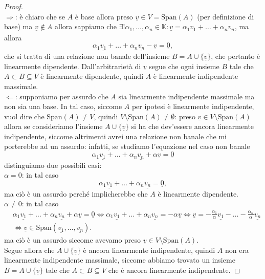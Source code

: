 \begin{proof} \hspace{1cm} \\
    $\boxed{\Rightarrow}$: è chiaro che se $A$ è base allora preso $\underline{v} \in V = \text{Span}(A)$ (per definizione di base) ma $\underline{v} \not\in A$ allora sappiamo che $\exists! \alpha_1, \ldots, \alpha_n \in \mathbb{K} : \underline{v} = \alpha_1 \underline{v_1} + \ldots + \alpha_n \underline{v_n}$, ma allora
    $$
        \alpha_1 \underline{v_1} + \ldots + \alpha_n \underline{v_n} - \underline{v} = \underline{0},
    $$
    che si tratta di una relazione non banale dell'insieme $B = A \cup \{\underline{v} \}$, che pertanto è linearmente dipendente. Dall'arbitrarietà di $\underline{v}$ segue che ogni insieme $B$ tale che $A \subset B \subseteq V$ è linearmente dipendente, quindi $A$ è linearmente indipendente massimale. \\
    $\boxed{\Leftarrow}$: supponiamo per assurdo che $A$ sia linearmente indipendente massimale ma non sia una base. In tal caso, siccome $A$ per ipotesi è linearmente indipendente, vuol dire che $\text{Span}(A) \neq V$, quindi $V \setminus \text{Span}(A) \neq \emptyset$: preso $\underline{v} \in V \setminus \text{Span}(A)$ allora se consideriamo l'insieme
    $A \cup \{ \underline{v} \}$ si ha che dev'essere ancora linearmente indipendente, siccome altrimenti avrei una relazione non banale che mi porterebbe ad un assurdo: infatti, se studiamo l'equazione nel caso non banale
    $$
        \alpha_1 \underline{v_1} + \ldots + \alpha_n \underline{v_n} + \alpha \underline{v} = \underline{0}
    $$
    distinguiamo due possibili casi: \\
    $\boxed{\alpha = 0}$: in tal caso
    $$
            \alpha_1 \underline{v_1} + \ldots + \alpha_n \underline{v_n} = \underline{0},
    $$
    ma ciò è un assurdo perché implicherebbe che $A$ è linearmente dipendente. \\
    $\boxed{\alpha \neq 0}$: in tal caso
    \begin{align}
        &\alpha_1 \underline{v_1} + \ldots + \alpha_n \underline{v_n} + \alpha \underline{v} = \underline{0} \iff \alpha_1 \underline{v_1} + \ldots + \alpha_n \underline{v_n} = - \alpha \underline{v} \iff \underline{v} = - \frac{\alpha_1}{\alpha} \underline{v_1} - \ldots - \frac{\alpha_n}{\alpha} \underline{v_n} \\
        &\iff \underline{v} \in \text{Span}(\underline{v_1}, \ldots, \underline{v_n}).
    \end{align}
    ma ciò è un assurdo siccome avevamo preso $\underline{v} \in V \setminus \text{Span}(A)$. \\
    Segue allora che $A \cup \{ \underline{v} \}$ è ancora linearmente indipendente, quindi $A$ non era linearmente indipendente massimale, siccome abbiamo trovato un insieme $B = A \cup \{ \underline{v} \}$ tale che $A \subset B \subseteq V$ che è ancora linearmente indipendente.
\end{proof}
